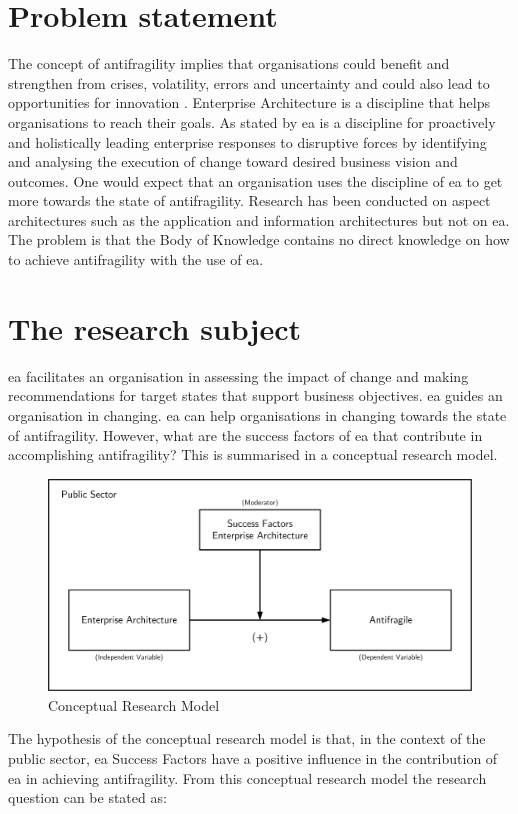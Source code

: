 \section{Problem statement}
\label{sec:problemstatement}
The concept of \gls{antifragility} implies that organisations could benefit and strengthen from crises, volatility, errors and uncertainty and could also lead to opportunities for innovation \parencite{Kastner2017}. Enterprise Architecture is a discipline that helps organisations to reach their goals. As stated by \textcite{Gartner} \acrshort{ea} is a discipline for proactively and holistically leading enterprise responses to disruptive forces by identifying and analysing the execution of change toward desired business vision and outcomes. One would expect that an organisation uses the discipline of \acrshort{ea} to get more towards the state of \gls{antifragility}. Research has been conducted on aspect architectures such as the application and information architectures but not on \acrshort{ea}. The problem is that the Body of Knowledge contains no direct knowledge on how to achieve \gls{antifragility} with the use of \acrshort{ea}. 

\section{The research subject}
\label{sec:researchsubject}
\acrshort{ea} facilitates an organisation in assessing the impact of change and making recommendations for target states that support business objectives. \acrshort{ea} guides an organisation in changing. \acrshort{ea} can help organisations in changing towards the state of \gls{antifragility}. However, what are the success factors of \acrshort{ea} that contribute in accomplishing \gls{antifragility}? This is summarised in a conceptual research model.
\begin{figure}[H]
	\centering
	\includegraphics[width=0.8\linewidth]{images/conceptualmodel}
	\caption[Conceptual Research Model]{Conceptual Research Model}
	\label{fig:conceptualmodel}
\end{figure}
The hypothesis of the conceptual research model is that, in the context of the public sector, \acrlong{ea} Success Factors have a positive influence in the contribution of \acrlong{ea} in achieving antifragility. From this conceptual research model the research question can be stated as:\bigskip

